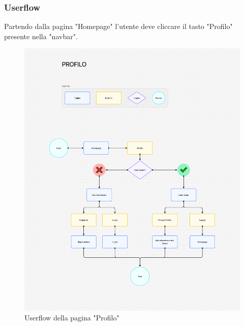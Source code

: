\documentclass{report}
\begin{document}
\subsubsection*{Userflow}
Partendo dalla pagina "Homepage" l'utente deve cliccare il tasto "Profilo" presente nella "navbar".
\begin{figure}[H]
	\centering\includegraphics[width=1\textwidth]{images/microservizio-autenticazione/frontend/profilo-userflow.png}
	Userflow della pagina "Profilo"
\end{figure}
\end{document}
